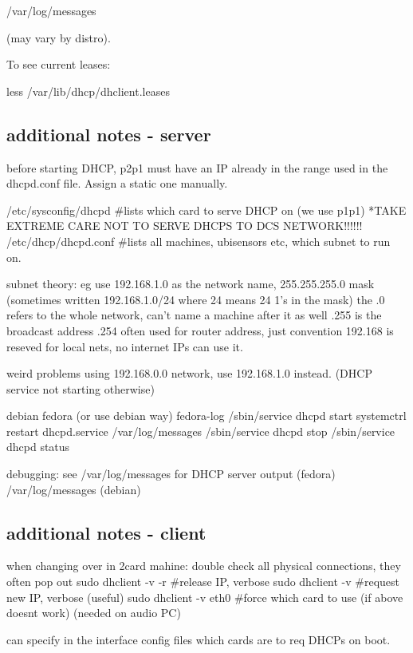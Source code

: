\documentclass[oneside,english]{scrbook}
\begin{document}
/var/log/messages

(may vary by distro).

To see current leases:

less /var/lib/dhcp/dhclient.leases

\subsection{additional notes - server}

before starting DHCP, p2p1 must have an IP already in the range used in the dhcpd.conf file.  Assign a static one manually.

/etc/sysconfig/dhcpd #lists which card to serve DHCP on (we use p1p1)   *TAKE EXTREME CARE NOT TO SERVE DHCPS TO DCS NETWORK!!!!!!
/etc/dhcp/dhcpd.conf   #lists all machines, ubisensors etc, which subnet to run on.

subnet theory:
    eg use 192.168.1.0 as the network name, 255.255.255.0 mask    (sometimes written 192.168.1.0/24 where 24 means 24 1's in the mask)
    the .0 refers to the whole network, can't name a machine after it as well
    .255 is the broadcast address
    .254 often used for router address, just convention
    192.168 is reseved for local nets, no internet IPs can use it.

weird problems using 192.168.0.0 network, use 192.168.1.0 instead. (DHCP service not starting otherwise)

  debian                fedora  (or use debian way)             fedora-log
/sbin/service dhcpd start       systemctrl restart dhcpd.service    /var/log/messages
/sbin/service dhcpd stop
/sbin/service dhcpd status

debugging: see /var/log/messages for DHCP server output (fedora)
           /var/log/messages   (debian)

\subsection{additional notes - client}

when changing over in 2card mahine:
    double check all physical connections, they often pop out
    sudo dhclient -v -r   #release IP, verbose
    sudo dhclient -v      #request new IP, verbose (useful)
    sudo dhclient -v eth0     #force which card to use (if above doesnt work) (needed on audio PC)

can specify in the interface config files which cards are to req DHCPs on boot.
\end{document}
